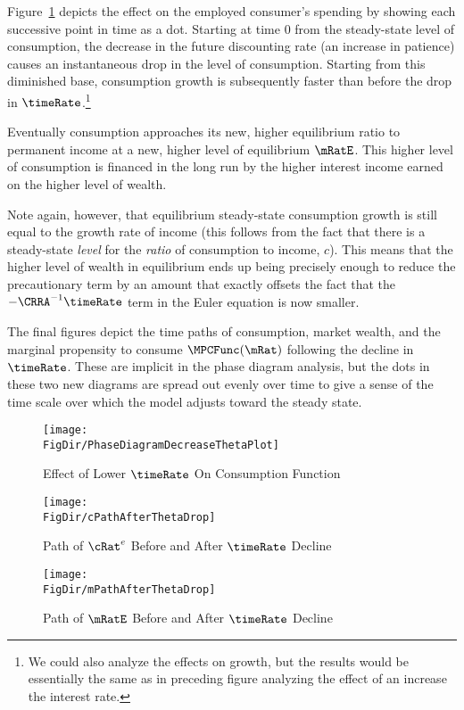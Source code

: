 \documentclass{\handout}
\begin{document}
Figure~\ref{fig:DecreaseTheta} depicts the effect on the 
employed consumer's spending by
showing each successive point in time as a dot.  
Starting at time 0 from the steady-state level of consumption, the
decrease in the future discounting rate (an increase in patience) causes
an instantaneous drop in the level of consumption.  Starting from this diminished 
base, consumption growth is subsequently faster than before the drop in $\timeRate$.\footnote{We could also analyze the effects on growth, but the
  results would be essentially the same as in preceding figure
  analyzing the effect of an increase the interest rate.}

Eventually consumption approaches its new, higher equilibrium ratio
to permanent income at a new, higher level of equilibrium $\mRatE$.  This
higher level of consumption is financed in the long run by the higher
interest income earned on the higher level of wealth.

Note again, however, that equilibrium steady-state 
consumption growth is still equal to the growth rate of income (this follows
from the fact that there is a steady-state {\it level} for the {\it
  ratio} of consumption to income, $c$).  This means that the higher
level of wealth in equilibrium ends up being precisely enough to
reduce the precautionary term by an amount that exactly offsets the
fact that the $-\CRRA^{-1}\timeRate$ term in the Euler equation is now
smaller.

The final figures depict the time paths of consumption, market wealth,
and the marginal propensity to consume $\MPCFunc(\mRat)$ following the
decline in $\timeRate$.  These are implicit in the phase diagram
analysis, but the dots in these two new diagrams are spread out evenly
over time to give a sense of the time scale over which the model
adjusts toward the steady state.

\begin{figure}
\caption{Effect of Lower $\timeRate$ On Consumption Function}
\texttt{[image: \\FigDir/PhaseDiagramDecreaseThetaPlot]}
\label{fig:DecreaseTheta}
\end{figure}

\begin{figure}
\caption{Path of ${\cRat}^{e}$ Before and After $\timeRate$ Decline}
\texttt{[image: \\FigDir/cPathAfterThetaDrop]}
\label{fig:cPathAfterThetaDrop}
\end{figure}

\begin{figure}
\caption{Path of $\mRatE$ Before and After $\timeRate$ Decline}
\texttt{[image: \\FigDir/mPathAfterThetaDrop]}
\label{fig:mPathAfterThetaDrop}
\end{figure}
\end{document}
